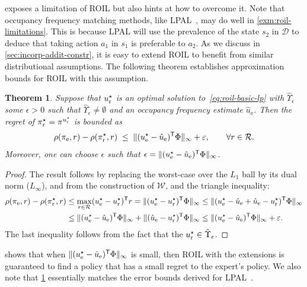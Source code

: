 \documentclass[10pt]{article}
\renewcommand{\cite}{\citep}
\theoremstyle{plain}
\newtheorem{theorem}{Theorem}
\theoremstyle{remark}
\begin{document}
 exposes a limitation of ROIL but also hints at how to overcome it. Note that occupancy frequency matching methods, like LPAL~\cite{Syed2008}, may do well in \cref{exm:roil-limitations}. This is because LPAL will use the prevalence of the state $s_2$ in $\mathcal{D}$ to deduce that taking action $a_1$ in $s_1$ is preferable to $a_2$. As we discuss in \cref{sec:incorp-addit-constr}, it is easy to extend ROIL to benefit from similar distributional assumptions. The following theorem establishes approximation bounds for ROIL with this assumption. 
\begin{theorem} \label{roilRegretBound}
Suppose that $u_{\mathrm{r}}^{\mathnormal{\star}}$ is an optimal solution to~\eqref{eq:roil-basic-lp} with $\hat{\Upsilon}_{\epsilon}$ some $\epsilon>0$ such that $\hat{\Upsilon}_{\epsilon} \neq \emptyset$ and an occupancy frequency estimate $\hat{u}_{\mathrm{e}}$. Then the regret of $\pi_{\mathrm{r}}^{\mathnormal{\star}}  = \pi^{u^{\mathnormal{\star}}_{\mathrm{r}}}$ is bounded as
\[
 \rho(\pi_{\mathrm{e}}, r) - \rho(\pi_{\mathrm{r}}^{\mathnormal{\star}}, r)
\;\leq\;
\| (u_{\mathrm{e}}^{\mathnormal{\star}}  - \hat{u}_{\mathrm{e}})^{\mathsf{T}} \Phi \|_\infty + \varepsilon,
\qquad \forall r\in \mathcal{R}.
\]
Moreover, one can choose $\epsilon$ such that $ \epsilon = \| (u_{\mathrm{e}}^{\mathnormal{\star}}  - \hat{u}_{\mathrm{e}})^{\mathsf{T}} \Phi \|_\infty$.
\end{theorem}
\begin{proof}
The result follows by replacing the worst-case over the $L_1$ ball by its dual norm ($L_{\infty}$), and from the construction of $\mathcal{W}$, and the triangle inequality:
\begin{align*}
\rho(\pi_{\mathrm{e}}, r) - \rho(\pi_{\mathrm{r}}^{\mathnormal{\star}}, r)
  &\le  \max_{r\in\mathcal{R}} (u_{\mathrm{e}}^{\mathnormal{\star}}  - u_{\mathrm{r}}^{\mathnormal{\star}})^{\mathsf{T}} r
    = \| (u_{\mathrm{e}}^{\mathnormal{\star}}  - u_{\mathrm{r}}^{\mathnormal{\star}})^{\mathsf{T}} \Phi \|_\infty
    \leq \| (u_{\mathrm{e}}^{\mathnormal{\star}}  - \hat{u}_{\mathrm{e}} + \hat{u}_{\mathrm{e}} - u_{\mathrm{r}}^{\mathnormal{\star}})^{\mathsf{T}} \Phi \|_\infty \\
&\leq \| (u_{\mathrm{e}}^{\mathnormal{\star}} -\hat{u}_{\mathrm{e}})^{\mathsf{T}} \Phi \|_\infty + \| (\hat{u}_{\mathrm{e}} - u_{\mathrm{r}}^{\mathnormal{\star}})^{\mathsf{T}} \Phi \|_\infty \leq  \| (u_{\mathrm{e}}^{\mathnormal{\star}} -\hat{u}_{\mathrm{e}})^{\mathsf{T}} \Phi \|_\infty + \varepsilon.
\end{align*}
The last inequality follows from the fact that the $u_{\mathrm{r}}^{\mathnormal{\star}}  \in \hat{\Upsilon}_{\epsilon}$.
\end{proof}

 shows that when $\| (u_{\mathrm{e}}^{\mathnormal{\star}}  - \hat{u}_{\mathrm{e}})^{\mathsf{T}} \Phi \|_\infty $ is small, then ROIL with the extensions is guaranteed to find a policy that has a small regret to the expert's policy. We also note that \cref{roilRegretBound} essentially matches the error bounds derived for LPAL~\cite{Syed2008}.
\end{document}
